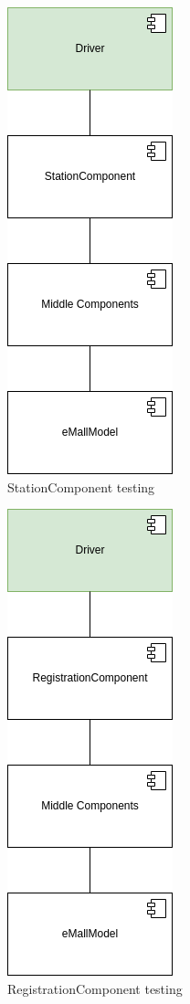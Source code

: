 \begin{figure}[H]
    \centering
    \includegraphics[keepaspectratio]{Testing/emall/station.png}
    \caption{StationComponent testing}
\end{figure}
\begin{figure}[H]
    \centering
    \includegraphics[keepaspectratio]{Testing/emall/registration.png}
    \caption{RegistrationComponent testing}
\end{figure}
